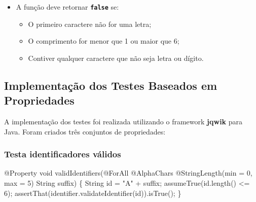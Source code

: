 \documentclass[
  letterpaper,
  DIV=11,
  numbers=noendperiod]{scrartcl}
\newenvironment{Shaded}{\begin{snugshade}}{\end{snugshade}}
\newcommand{\AttributeTok}[1]{\textcolor[rgb]{0.40,0.45,0.13}{#1}}
\newcommand{\BuiltInTok}[1]{\textcolor[rgb]{0.00,0.23,0.31}{#1}}
\newcommand{\DataTypeTok}[1]{\textcolor[rgb]{0.68,0.00,0.00}{#1}}
\newcommand{\DecValTok}[1]{\textcolor[rgb]{0.68,0.00,0.00}{#1}}
\newcommand{\FunctionTok}[1]{\textcolor[rgb]{0.28,0.35,0.67}{#1}}
\newcommand{\NormalTok}[1]{\textcolor[rgb]{0.00,0.23,0.31}{#1}}
\newcommand{\OperatorTok}[1]{\textcolor[rgb]{0.37,0.37,0.37}{#1}}
\newcommand{\StringTok}[1]{\textcolor[rgb]{0.13,0.47,0.30}{#1}}
\providecommand{\tightlist}{%
  \setlength{\itemsep}{0pt}\setlength{\parskip}{0pt}}
\begin{document}
\begin{itemize}
\tightlist
\item
  A função deve retornar \textbf{\texttt{false}} se:

  \begin{itemize}
  \tightlist
  \item
    O primeiro caractere não for uma letra;
  \item
    O comprimento for menor que 1 ou maior que 6;
  \item
    Contiver qualquer caractere que não seja letra ou dígito.
  \end{itemize}
\end{itemize}

\subsection{Implementação dos Testes Baseados em
Propriedades}\label{implementauxe7uxe3o-dos-testes-baseados-em-propriedades}

A implementação dos testes foi realizada utilizando o framework
\textbf{jqwik} para Java. Foram criados três conjuntos de propriedades:

\subsubsection{\texorpdfstring{\textbf{Testa identificadores
válidos}}{Testa identificadores válidos}}\label{testa-identificadores-vuxe1lidos}

\begin{Shaded}
\begin{Highlighting}[]
\AttributeTok{@Property}
\DataTypeTok{void} \FunctionTok{validIdentifiers}\OperatorTok{(}\AttributeTok{@ForAll} \AttributeTok{@AlphaChars} \AttributeTok{@StringLength}\OperatorTok{(}\NormalTok{min }\OperatorTok{=} \DecValTok{0}\OperatorTok{,}\NormalTok{ max }\OperatorTok{=} \DecValTok{5}\OperatorTok{)} \BuiltInTok{String}\NormalTok{ suffix}\OperatorTok{)} \OperatorTok{\{}
    \BuiltInTok{String}\NormalTok{ id }\OperatorTok{=} \StringTok{"A"} \OperatorTok{+}\NormalTok{ suffix}\OperatorTok{;}
    \FunctionTok{assumeTrue}\OperatorTok{(}\NormalTok{id}\OperatorTok{.}\FunctionTok{length}\OperatorTok{()} \OperatorTok{\textless{}=} \DecValTok{6}\OperatorTok{);}
    \FunctionTok{assertThat}\OperatorTok{(}\NormalTok{identifier}\OperatorTok{.}\FunctionTok{validateIdentifier}\OperatorTok{(}\NormalTok{id}\OperatorTok{)).}\FunctionTok{isTrue}\OperatorTok{();}
\OperatorTok{\}}
\end{Highlighting}
\end{Shaded}
\end{document}
